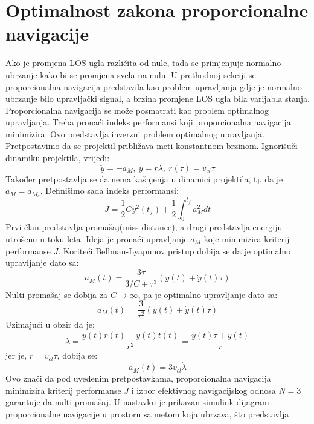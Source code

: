 \section{Optimalnost zakona proporcionalne navigacije}
Ako je promjena LOS ugla različita od nule, tada se primjenjuje normalno ubrzanje kako bi 
se promjena svela na nulu. U prethodnoj sekciji se proporcionalna navigacija predstavila kao 
problem upravljanja gdje je normalno ubrzanje bilo upravljački signal, a brzina promjene LOS ugla bila varijabla stanja.
Proporcionalna navigacija se može posmatrati kao problem optimalnog upravljanja. Treba pronaći indeks performansi koji 
proporcionalna navigacija minimizira. Ovo predstavlja inverzni problem optimalnog upravljanja. Pretpostavimo da 
se projektil približava meti konstantnom brzinom. Ignorišuči dinamiku projektila, vrijedi:
\begin{equation}
    \ddot{y}=-a_M,\ y=r\lambda,\ r(\tau)=v_{cl}\tau
\end{equation}
Također pretpostavlja se da nema kašnjenja u dinamici projektila, tj. da je $a_M = a_{M_c}$.
Definišimo sada indeks performansi:
\begin{equation}
    J=\frac{1}{2}Cy^2(t_f)+\frac{1}{2}\int_0^{t_f}{a_M^2dt}
\end{equation}
Prvi član predstavlja promašaj(miss distance), a drugi predstavlja energiju utrošenu u toku leta. Ideja je pronaći upravljanje
$a_M$ koje minimizira kriterij performanse $J$. Koriteći Bellman-Lyapunov pristup dobija se da je 
optimalno upravljanje dato sa:
\begin{equation}
    a_M(t)=\frac{3\tau}{3/C+\tau ^3}(y(t)+\dot{y}(t)\tau)
\end{equation}
Nulti promašaj se dobija za $C\rightarrow \infty$, pa je optimalno upravljanje dato sa:
\begin{equation}
    a_M(t)=\frac{3}{\tau ^2}(y(t)+\dot{y}(t)\tau)
\end{equation}
Uzimajući u obzir da je:
\begin{equation}
    \dot{\lambda} = \frac{\dot{y}(t)r(t)-y(t)\dot{t}(t)}{r^2}=\frac{\dot{y}(t)\tau + y(t)}{r}
\end{equation}
jer je, $r=v_{cl}\tau$, dobija se:
\begin{equation}
    a_M(t)=3v_{cl}\dot{\lambda}
\end{equation}
Ovo znači da pod uvedenim pretpostavkama, proporcionalna navigacija minimizira kriterij performanse
$J$ i izbor efektivnog navigacijskog odnosa $N=3$ garantuje da nulti promašaj. 
U nastavku je prikazan simulink dijagram proporcionalne navigacije u prostoru sa metom koja ubrzava, što predstavlja 

